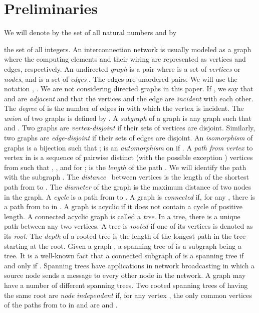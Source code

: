 \documentclass[12pt,journal,compsoc,onecolumn,]{IEEEtran}
\begin{document}
\section{Preliminaries\label{SectionPrelim}}

We will denote by  the set of all natural numbers and
by { the set of all
integers. An interconnection network is usually modeled as a graph where the
computing elements and their wiring are represented as vertices and edges,
respectively. An undirected \textsl{graph} is a pair  where  is a
set of \textsl{vertices} or \textsl{nodes}, and  is a set of
\textsl{edges }. The edges are unordered pairs. We will use the
notation , . We are not considering directed graphs in this paper.
If , we say that
 and  are \textsl{adjacent }and that the vertices 
and the edge  are \textsl{incident }with each other.
The \textsl{degree} of  is the number of
edges in  with which the vertex  is incident.
The \textsl{union }of two graphs is defined by  . A
\textsl{subgraph }of a graph  is any graph  such that  and .
Two graphs are \textsl{vertex-disjoint } if their sets
of vertices are disjoint.
Similarly, two graphs are \textsl{edge-disjoint } if their sets
of edges are disjoint. An \textsl{isomorphism} of graphs
 is
a bijection  such that ;  is an \textsl{automorphism} on  if .
A\textsl{ path from vertex } to vertex  in  is a sequence
 of
pairwise distinct (with the possible exception ) vertices from
 such that , , and 
for ;  is the \textsl{length} of the
path . We will identify the path  with the subgraph . The
\textsl{distance }\  between vertices  is the
length of the shortest path from  to . The \textsl{diameter} of the
graph is the maximum distance of two nodes in the graph. A \textsl{cycle }is a
path from  to . A graph is \textsl{connected} if, for any ,
there is a path from  to  in . A graph is acyclic if it does not contain a cycle of
positive length. A connected acyclic graph is called a \textsl{tree}. In a
tree, there is a unique path between any two vertices. A tree is
\textsl{rooted }if one of its vertices is denoted as its \textsl{root}. The
\textsl{depth }of a rooted tree is the length of the longest path in the tree
starting at the root. Given a graph , a spanning tree of  is a
subgraph  being a tree. It is a well-known
fact that a connected subgraph  of  is a
spanning tree if and only if . Spanning trees have applications in network broadcasting in
which a source node sends a message to every other node in the network. A
graph may have a number of different spanning trees. Two rooted spanning trees  of  having the same root  are \textsl{node}
\textsl{independent} if, for any vertex , the only common vertices of
the paths from  to  in  and  are  and .

}
\end{document}
